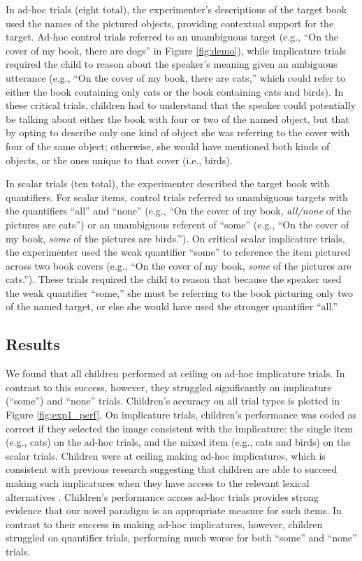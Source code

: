 \documentclass[man]{apa2}
\begin{document}
In ad-hoc trials (eight total), the experimenter's descriptions of the target book used the names of the pictured objects, providing contextual support for the target. Ad-hoc control trials referred to an unambiguous target (e.g., ``On the cover of my book, there are dogs'' in Figure \ref{fig:demo}), while implicature trials required the child to reason about the speaker's meaning given an ambiguous utterance (e.g., ``On the cover of my book, there are cats,'' which could refer to either the book containing only cats or the book containing cats and birds). In these critical trials, children had to understand that the speaker could potentially be talking about either the book with four or two of the named object, but that by opting to describe only one kind of object she was referring to the cover with four of the same object; otherwise, she would have mentioned both kinds of objects, or the ones unique to that cover (i.e., birds).

In scalar trials (ten total), the experimenter described the target book with quantifiers. For scalar items, control trials referred to unambiguous targets with the quantifiers ``all'' and ``none'' (e.g., ``On the cover of my book, \textit{all/none} of the pictures are cats'') or an unambiguous referent of ``some'' (e.g., ``On the cover of my book, \textit{some} of the pictures are birds.''). On critical scalar implicature trials, the experimenter used the weak quantifier ``some'' to reference the item pictured across two book covers (e.g., ``On the cover of my book, \textit{some} of the pictures are cats.''). These trials required the child to reason that because the speaker used the weak quantifier ``some,'' she must be referring to the book picturing only two of the named target, or else she would have used the stronger quantifier ``all.''

\subsection{Results}

We found that all children performed at ceiling on ad-hoc implicature trials. In contrast to this success, however, they struggled significantly on implicature (``some'') and ``none'' trials. Children's accuracy on all trial types is plotted in Figure \ref{fig:exp1_perf}. On implicature trials, children's performance was coded as correct if they selected the image consistent with the implicature: the single item (e.g., cats) on the ad-hoc trials, and the mixed item (e.g., cats and birds) on the scalar trials. Children were at ceiling making ad-hoc implicatures, which is consistent with previous research suggesting that children are able to succeed making such implicatures when they have access to the relevant lexical alternatives \cite{stiller2015}. Children's performance across ad-hoc trials provides strong evidence that our novel paradigm is an appropriate measure for such items. In contrast to their success in making ad-hoc implicatures, however, children struggled on quantifier trials, performing much worse for both ``some'' and ``none'' trials.
\end{document}
